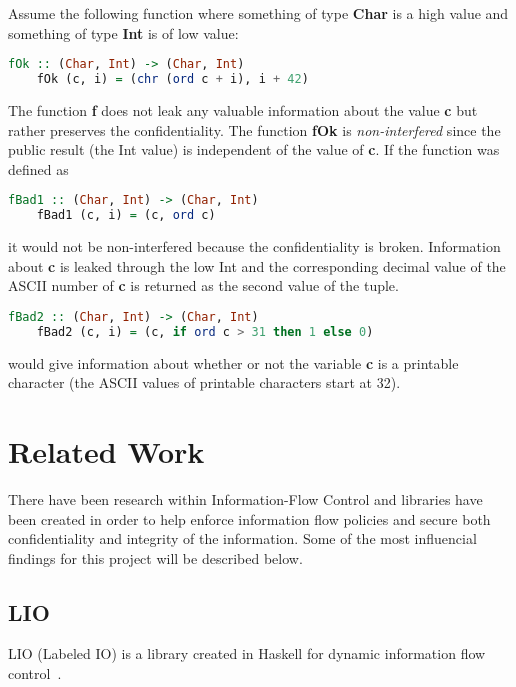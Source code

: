Assume the following function where something of type \textbf{Char} is a high value and something of type \textbf{Int} is of low value:
\begin{center}
  \begin{lstlisting}[language=Haskell]
    fOk :: (Char, Int) -> (Char, Int)
    fOk (c, i) = (chr (ord c + i), i + 42)
  \end{lstlisting}
\end{center}
The function \textbf{f} does not leak any valuable information about the value \textbf{c} but rather preserves the confidentiality. The function \textbf{fOk} is \emph{non-interfered} since the public result (the Int value) is independent of the value of \textbf{c}. If the function was defined as
\begin{center}
  \begin{lstlisting}[language=Haskell]
    fBad1 :: (Char, Int) -> (Char, Int)
    fBad1 (c, i) = (c, ord c)
  \end{lstlisting}
\end{center}
it would not be non-interfered because the confidentiality is broken. Information about \textbf{c} is leaked through the low Int and the corresponding decimal value of the ASCII number of \textbf{c} is returned as the second value of the tuple.

\begin{center}
  \begin{lstlisting}[language=Haskell]
    fBad2 :: (Char, Int) -> (Char, Int)
    fBad2 (c, i) = (c, if ord c > 31 then 1 else 0)
  \end{lstlisting}
\end{center}
would give information about whether or not the variable \textbf{c} is a printable character (the ASCII values of printable characters start at 32\cite{ascii}).\cite{seclib}

\section{Related Work}
\label{chapter:related}
There have been research within Information-Flow Control and libraries have been created in order to help enforce information flow policies and secure both confidentiality and integrity of the information. Some of the most influencial findings for this project will be described below.
\subsection{LIO}
LIO (Labeled IO) is a library created in Haskell for dynamic information flow control~\cite{lio-2011}.
